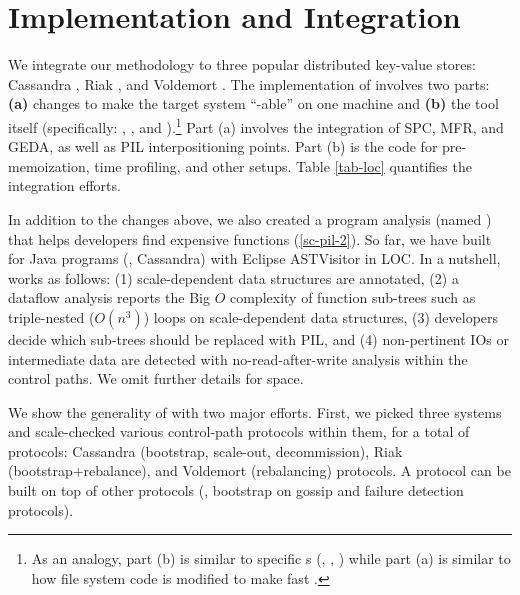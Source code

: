 

\section{Implementation and Integration}
\label{sec-impl}









We integrate our \sck methodology to three popular distributed key-value
stores: Cassandra \cite{Lakshman+09-Cassandra}, Riak \cite{RiakWeb}, and
Voldemort \cite{VoldemortWeb}.
%
The implementation of \sck involves two parts:
%
{\bf (a)} changes to make the target system ``\sck-able'' on one machine and
%
{\bf (b)} the  tool itself (specifically: \scass, \svold, and
\sriak).\footnote{As an analogy, part (b) is similar to specific s
  (\eg, , ) while part (a) is
  similar to how file system code is modified to make 
  fast \cite{Henson+06-Chunkfs, Ma+13-Ffsck}.}
Part (a) involves
the integration of SPC, MFR, and GEDA, as well as PIL interpositioning
points.  Part (b) is the code for pre-memoization, time profiling, and
other  setups.
%
Table \ref{tab-loc} quantifies the integration efforts.  
%

In addition to the changes above, we also created a program analysis
(named \prx) that helps developers  find expensive functions
(\sec\ref{sc-pil-2}).
%
So far, we have built \prx for Java programs (\eg, Cassandra) with Eclipse
ASTVisitor in \locParser LOC.
%
In a nutshell, \prx works as follows: (1) scale-dependent data structures
are annotated, (2) a dataflow analysis reports the Big $O$ complexity of
function sub-trees such as triple-nested ($O(n^3)$) loops on
scale-dependent data structures, (3) developers decide which sub-trees
should be replaced with PIL, and (4) non-pertinent IOs or intermediate
data are detected with no-read-after-write analysis within the control
paths.  We omit further details for space.



 We show the generality of \sck with two major efforts.
First, we picked three systems and scale-checked various control-path
protocols within them, for a total of \numProt protocols:
%
\numProtCass Cassandra (bootstrap, scale-out, decommission),
%
\numProtRiak Riak (bootstrap+rebalance), and 
%
\numProtVold Voldemort (rebalancing) protocols.
%
A protocol can be built on top of other protocols (\eg, bootstrap on
gossip and failure detection protocols).


